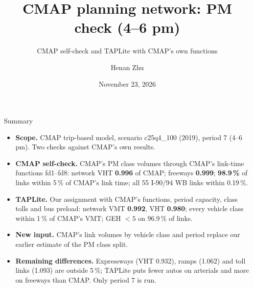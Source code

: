 \documentclass[aspectratio=169,11pt]{beamer}
\title{CMAP planning network: PM check (4--6 pm)}
\subtitle{CMAP self-check and TAPLite with CMAP's own functions}
\author{Henan Zhu}
\institute{Arizona State University}
\date{November 23, 2026}
\newcommand{\ok}[1]{\textcolor{okgreen}{\textbf{#1}}}
\begin{document}
\begin{frame}\titlepage\end{frame}

\begin{frame}{Summary}
\begin{itemize}
\item \textbf{Scope.} CMAP trip-based model, scenario c25q4\_100 (2019), period 7 (4--6 pm). Two checks against CMAP's own results.
\item \textbf{CMAP self-check.} CMAP's PM class volumes through CMAP's link-time functions fd1--fd8:
  network VHT \ok{0.996} of CMAP; freeways \ok{0.999}; \ok{98.9\,\%} of links within 5\,\% of CMAP's link time;
  all 55 I-90/94 WB links within 0.19\,\%.
\item \textbf{TAPLite.} Our assignment with CMAP's functions, period capacity, class tolls and bus preload:
  network VMT \ok{0.992}, VHT \ok{0.980}; every vehicle class within 1\,\% of CMAP's VMT; GEH $<5$ on 96.9\,\% of links.
\item \textbf{New input.} CMAP's link volumes by vehicle class and period replace our earlier estimate of the PM class split.
\item \textbf{Remaining differences.} Expressways (VHT 0.932), ramps (1.062) and toll links (1.093) are outside 5\,\%; TAPLite puts fewer autos on arterials and more on freeways than CMAP. Only period 7 is run.
\end{itemize}
\end{frame}
\end{document}

